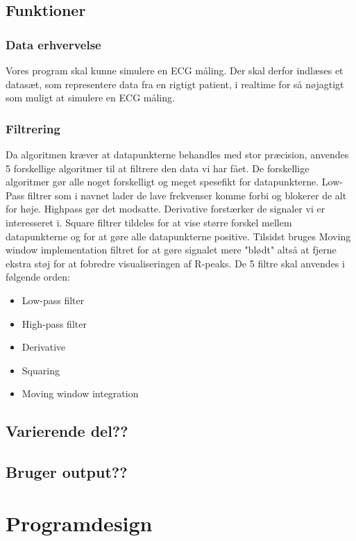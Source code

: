 \documentclass[a4paper,12pt]{article}
\begin{document}
\subsection{Funktioner}
\subsubsection{Data erhvervelse}
Vores program skal kunne simulere en ECG måling. Der skal derfor indlæses et datasæt, som representere data fra en rigtigt patient, i realtime for så nøjagtigt som muligt at simulere en ECG måling.  
\subsubsection{Filtrering}
Da algoritmen kræver at datapunkterne behandles med stor præcision, anvendes 5 forskellige algoritmer til at filtrere den data vi har fået. De forskellige algoritmer gør alle noget forskelligt og meget spesefikt for datapunkterne. Low-Pass filtrer som i navnet lader de lave frekvenser komme forbi og blokerer de alt for høje. Highpass gør det modsatte. Derivative forstærker de signaler vi er interesseret i. Square filtrer tildeles for at vise større forskel mellem datapunkterne og for at gøre alle datapunkterne positive. Tilsidst bruges Moving window implementation filtret for at gøre signalet mere "blødt" altså at fjerne ekstra støj for at fobredre visualiseringen af R-peaks. De 5 filtre skal anvendes i følgende orden:
\begin{itemize}
\item Low-pass filter
\item High-pass filter
\item Derivative
\item Squaring
\item Moving window integration
\end{itemize}
\newpage

\subsection{Varierende del??}
\subsection{Bruger output??}
\section{Programdesign}
\end{document}
